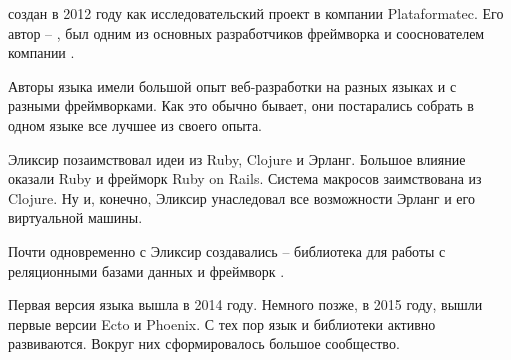  создан в 2012 году как исследовательский проект в компании Plataformatec. Его автор -- , был одним из основных разработчиков фреймворка  и сооснователем компании .

Авторы языка имели большой опыт веб-разработки на разных языках и с разными фреймворками. Как это обычно бывает, они постарались собрать в одном языке все лучшее из своего опыта.

Эликсир позаимствовал идеи из Ruby, Clojure и Эрланг. Большое влияние оказали Ruby и фрейморк Ruby on Rails. Система макросов заимствована из Clojure. Ну и, конечно, Эликсир унаследовал все возможности Эрланг и его виртуальной машины.

Почти одновременно с Эликсир создавались  -- библиотека для работы с реляционными базами данных и фреймворк .

Первая версия языка вышла в 2014 году. Немного позже, в 2015 году, вышли первые версии Ecto и Phoenix. С тех пор язык и библиотеки активно развиваются. Вокруг них сформировалось большое сообщество.
